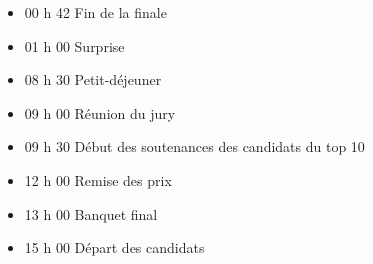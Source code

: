 \documentclass[a4paper,11pt]{prologin}
\begin{document}
    \begin{itemize}
        \item 00 h 42                 Fin de la finale
        \item 01 h 00                 Surprise
        \item 08 h 30                 Petit-déjeuner
        \item 09 h 00                 Réunion du jury
        \item 09 h 30                 Début des soutenances des candidats du top 10
        \item 12 h 00                 Remise des prix
        \item 13 h 00                 Banquet final
        \item 15 h 00                 Départ des candidats
    \end{itemize}
\end{document}

